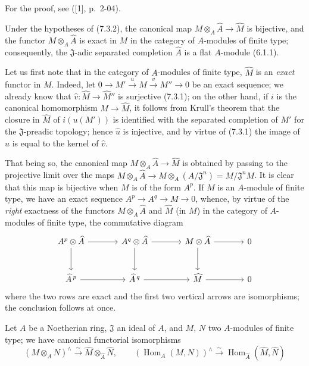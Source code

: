 For the proof, see ([1], p.~2-04).


\begin{corollary}[7.3.3]
\label{0.7.3.3}
Under the hypotheses of \textup{(7.3.2)}, the canonical map
$M\otimes_A\widehat A\to\widehat M$ is bijective, and the functor
$M\otimes_A\widehat A$ is exact in $M$ in the category of $A$-modules of
finite type; consequently, the $\mathfrak J$-adic separated completion $\widehat A$
is a flat $A$-module \textup{(6.1.1)}.
\end{corollary}

Let us first note that in the category of $A$-modules of finite type,
$\widehat M$ is an \emph{exact} functor in $M$. Indeed, let $0\to M'\xrightarrow{u}M\xrightarrow{v}M''\to0$
be an exact sequence; we already know that
$\widehat v:\widehat M\to\widehat{M}''$ is surjective (7.3.1); on the other hand,
if $i$ is the canonical homomorphism $M\to\widehat M$, it follows from Krull's
theorem that the closure in $\widehat M$ of $i(u(M'))$ is identified with the separated
completion of $M'$ for the $\mathfrak J$-preadic topology; hence
$\widehat u$ is injective, and by virtue of (7.3.1) the image of $\widehat u$ is
equal to the kernel of $\widehat v$.

That being so, the canonical map $M\otimes_A\widehat A\to\widehat M$
is obtained by passing to the projective limit over the maps $M\otimes_A\widehat A\to M\otimes_A(A/\mathfrak J^n)=M/\mathfrak J^nM$.
It is clear that this map is bijective when $M$ is of the form
$A^p$. If $M$ is an $A$-module of finite type, we have an exact sequence
$A^p\to A^q\to M\to0$, whence, by virtue of the \emph{right} exactness of the
functors $M\otimes_A\widehat A$ and $\widehat M$ (in $M$) in the category
of $A$-modules of finite type, the commutative diagram
\[
\begin{tikzcd}[column sep=large,row sep=large]
  A^p\otimes\widehat A \arrow[r] \arrow[d] &
  A^q\otimes\widehat A \arrow[r] \arrow[d] &
  M\otimes\widehat A \arrow[r] \arrow[d] &
  0 \\
  \widehat A^{\,p} \arrow[r] &
  \widehat A^{\,q} \arrow[r] &
  \widehat M \arrow[r] &
  0
\end{tikzcd}
\]
where the two rows are exact and the first two vertical arrows are
isomorphisms; the conclusion follows at once.

\begin{corollary}[7.3.4]
\label{0.7.3.4}
Let $A$ be a Noetherian ring, $\mathfrak J$ an ideal of $A$, and $M$, $N$ two
$A$-modules of finite type; we have canonical functorial isomorphisms
\[
  (M\otimes_A N)^\wedge
  \xrightarrow{\sim}
  \widehat M\otimes_{\widehat A}\widehat N,
  \qquad
  (\operatorname{Hom}_A(M,N))^\wedge
  \xrightarrow{\sim}
  \operatorname{Hom}_{\widehat A}(\widehat M,\widehat N)
\]
\end{corollary}

